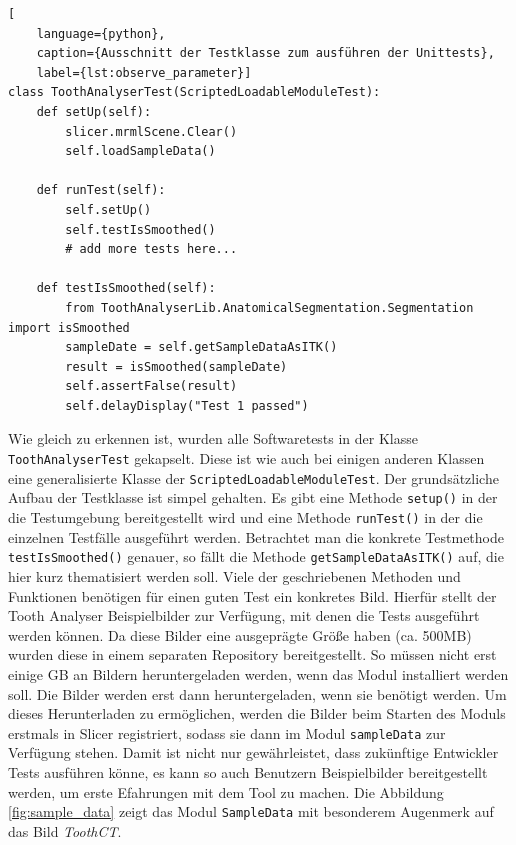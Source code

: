 \begin{lstlisting}[
    language={python},
    caption={Ausschnitt der Testklasse zum ausführen der Unittests},
    label={lst:observe_parameter}]
class ToothAnalyserTest(ScriptedLoadableModuleTest):
    def setUp(self):
	    slicer.mrmlScene.Clear()
	    self.loadSampleData()

    def runTest(self):
	    self.setUp()
	    self.testIsSmoothed()
	    # add more tests here...

    def testIsSmoothed(self):
	    from ToothAnalyserLib.AnatomicalSegmentation.Segmentation import isSmoothed
	    sampleDate = self.getSampleDataAsITK()
 	    result = isSmoothed(sampleDate)
	    self.assertFalse(result)
	    self.delayDisplay("Test 1 passed")
\end{lstlisting}

Wie gleich zu erkennen ist, wurden alle Softwaretests in der Klasse \texttt{ToothAnalyserTest}
gekapselt. Diese ist wie auch bei einigen anderen Klassen eine generalisierte Klasse
der \texttt{ScriptedLoadableModuleTest}. Der grundsätzliche Aufbau der Testklasse
ist simpel gehalten. Es gibt eine Methode \texttt{setup()} in der die Testumgebung
bereitgestellt wird und eine Methode \texttt{runTest()} in der die einzelnen
Testfälle ausgeführt werden. Betrachtet man die konkrete Testmethode \texttt{testIsSmoothed()}
genauer, so fällt die Methode \texttt{getSampleDataAsITK()} auf, die hier kurz thematisiert
werden soll. Viele der geschriebenen Methoden und Funktionen benötigen für einen
guten Test ein konkretes Bild. Hierfür stellt der Tooth Analyser Beispielbilder zur
Verfügung, mit denen die Tests ausgeführt werden können. Da diese Bilder eine ausgeprägte
Größe haben (ca. 500MB) wurden diese in einem separaten Repository
bereitgestellt. So müssen nicht erst einige \ac{GB} an Bildern heruntergeladen
werden, wenn das Modul installiert werden soll. Die Bilder werden erst dann
heruntergeladen, wenn sie benötigt werden. Um dieses Herunterladen zu
ermöglichen, werden die Bilder beim Starten des Moduls erstmals in Slicer registriert,
sodass sie dann im Modul \texttt{sampleData} zur Verfügung stehen. Damit ist
nicht nur gewährleistet, dass zukünftige Entwickler Tests ausführen könne, es
kann so auch Benutzern Beispielbilder bereitgestellt werden, um erste Efahrungen
mit dem Tool zu machen. Die Abbildung \ref{fig:sample_data} zeigt das Modul
\texttt{SampleData} mit besonderem Augenmerk auf das Bild \textit{ToothCT}.


